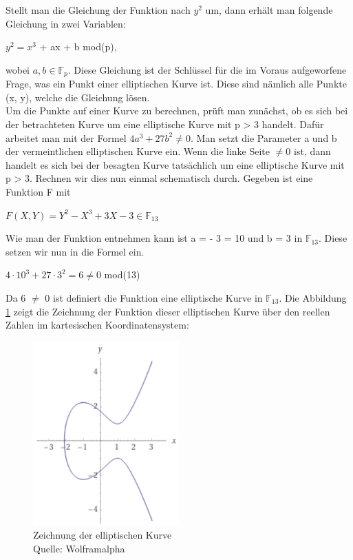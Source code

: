 Stellt man die Gleichung der Funktion nach $y^{2}$ um, dann erhält man folgende Gleichung in zwei Variablen:
\begin{center}
$y^{2} =  x^{3}$ + ax + b  mod(p),
\end{center}

wobei $a, b \in \mathbb{F}_p$. Diese Gleichung ist der Schlüssel für die im Voraus aufgeworfene Frage, was ein Punkt einer elliptischen Kurve ist. Diese sind nämlich alle Punkte (x, y), welche die Gleichung lösen.\\

Um die Punkte auf einer Kurve zu berechnen, prüft man zunächst, ob es sich bei der betrachteten Kurve um eine elliptische Kurve mit p > 3 handelt. Dafür arbeitet man mit der Formel  $4a^3 + 27b^2 \neq 0$. Man setzt die Parameter a und b der vermeintlichen elliptischen Kurve ein. Wenn die linke Seite $\neq 0$ ist, dann handelt es sich bei der besagten Kurve tatsächlich um eine elliptische Kurve mit p > 3. Rechnen wir dies nun einmal schematisch durch. Gegeben ist eine Funktion F mit
\begin{center}
$F(X, Y) = Y^{2} - X^{3} + 3X - 3 \in \mathbb{F}_{13}$
\end{center} 

Wie man der Funktion entnehmen kann ist a = - 3 = 10 und b = 3 in $\mathbb{F}_{13}$. Diese setzen wir nun in die Formel ein.
\begin{center}
$4 \cdot 10^3 + 27 \cdot 3^2 = 6 \neq 0$ mod(13)
\end{center} 

Da 6 $\neq$ 0 ist definiert die Funktion eine elliptische Kurve in $\mathbb{F}_{13}$. Die Abbildung \ref{fig:kurve_beispiel_1_punktberechnung} zeigt die Zeichnung der Funktion dieser elliptischen Kurve über den reellen Zahlen im kartesischen Koordinatensystem: 

\begin{figure}[H]
    \centering
    \includegraphics[width=0.5\textwidth]{grafiken/kurve_beispiel_1_punktberechnung.png}
    \caption[Zeichnung der elliptischen Kurve]{Zeichnung der elliptischen Kurve \\ Quelle: Wolframalpha}
    \label{fig:kurve_beispiel_1_punktberechnung}
\end{figure}

